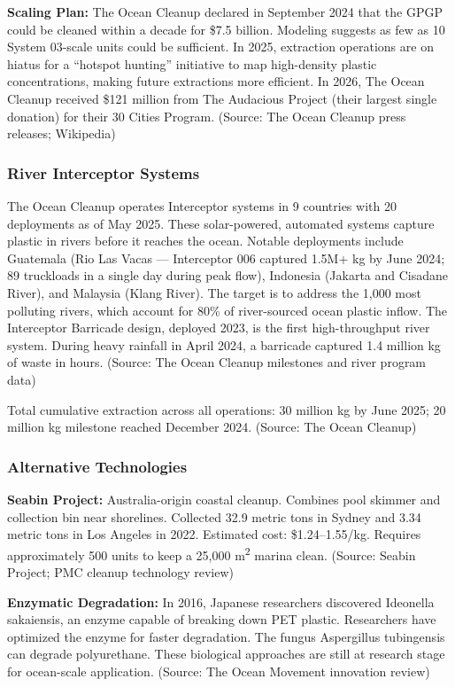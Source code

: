 \documentclass[11pt,letterpaper]{article}
\begin{document}
\textbf{Scaling Plan:} The Ocean Cleanup declared in September 2024 that the GPGP could be cleaned within a decade for \$7.5 billion. Modeling suggests as few as 10 System 03-scale units could be sufficient. In 2025, extraction operations are on hiatus for a ``hotspot hunting'' initiative to map high-density plastic concentrations, making future extractions more efficient. In 2026, The Ocean Cleanup received \$121 million from The Audacious Project (their largest single donation) for their 30 Cities Program. (Source: The Ocean Cleanup press releases; Wikipedia)

\subsubsection{River Interceptor Systems}
The Ocean Cleanup operates Interceptor systems in 9 countries with 20 deployments as of May 2025. These solar-powered, automated systems capture plastic in rivers before it reaches the ocean. Notable deployments include Guatemala (Rio Las Vacas --- Interceptor 006 captured 1.5M+ kg by June 2024; 89 truckloads in a single day during peak flow), Indonesia (Jakarta and Cisadane River), and Malaysia (Klang River). The target is to address the 1,000 most polluting rivers, which account for 80\% of river-sourced ocean plastic inflow. The Interceptor Barricade design, deployed 2023, is the first high-throughput river system. During heavy rainfall in April 2024, a barricade captured 1.4 million kg of waste in hours. (Source: The Ocean Cleanup milestones and river program data)

Total cumulative extraction across all operations: 30 million kg by June 2025; 20 million kg milestone reached December 2024. (Source: The Ocean Cleanup)

\subsubsection{Alternative Technologies}
\textbf{Seabin Project:} Australia-origin coastal cleanup. Combines pool skimmer and collection bin near shorelines. Collected 32.9 metric tons in Sydney and 3.34 metric tons in Los Angeles in 2022. Estimated cost: \$1.24--1.55/kg. Requires approximately 500 units to keep a 25,000 m\textsuperscript{2} marina clean. (Source: Seabin Project; PMC cleanup technology review)

\textbf{Enzymatic Degradation:} In 2016, Japanese researchers discovered Ideonella sakaiensis, an enzyme capable of breaking down PET plastic. Researchers have optimized the enzyme for faster degradation. The fungus Aspergillus tubingensis can degrade polyurethane. These biological approaches are still at research stage for ocean-scale application. (Source: The Ocean Movement innovation review)
\end{document}
